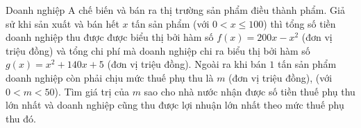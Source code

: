 \begin{ex}%
	Doanh nghiệp A chế biến và bán ra thị trường sản phẩm điều thành phẩm. Giả sử khi sản xuất và bán hết $x$ tấn sản phẩm (với $0<x\le 100$) thì tổng số tiền doanh nghiệp thu được được biểu thị bởi hàm số $f(x)=200x-x^2$ (đơn vị triệu đồng) và tổng chi phí mà doanh nghiệp chi ra biểu thị bởi hàm số $g(x)=x^2+140x+5$ (đơn vị triệu đồng). Ngoài ra khi bán $1$ tấn sản phẩm doanh nghiệp còn phải chịu mức thuế phụ thu là $m$ (đơn vị triệu đồng), (với $0<m<50$). Tìm giá trị của $m$ sao cho nhà nước nhận được số tiền thuế phụ thu lớn nhất và doanh nghiệp cũng thu được lợi nhuận lớn nhất theo mức thuế phụ thu đó.
\end{ex} 

